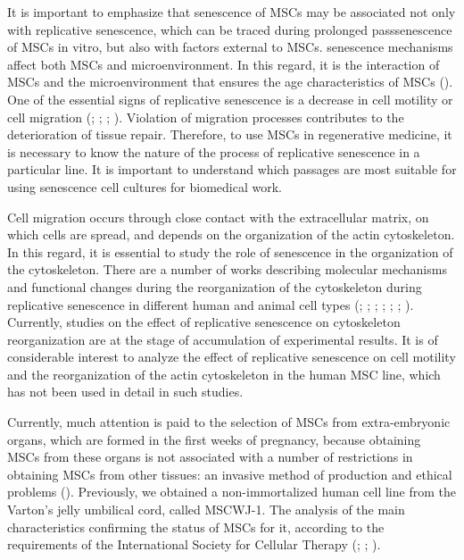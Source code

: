 \documentclass[english,authoryear]{elsarticle}
\begin{document}
It is important to emphasize that senescence of MSCs may be associated not only with replicative senescence, which can be traced during prolonged passsenescence of MSCs in vitro, but also with factors external to MSCs.
senescence mechanisms affect both MSCs and microenvironment.
In this regard, it is the interaction of MSCs and the microenvironment that ensures the age characteristics of MSCs (\cite{sethe2006senescence}).
One of the essential signs of replicative senescence is a decrease in cell motility or cell migration (\cite{geissler2012functional}; \cite{bertolo2015vitro}; \cite{turinetto2016senescence}; \cite{zhang2018overexpression}).
Violation of migration processes contributes to the deterioration of tissue repair.
Therefore, to use MSCs in regenerative medicine, it is necessary to know the nature of the process of replicative senescence in a particular line.
It is important to understand which passages are most suitable for using senescence cell cultures for biomedical work.


Cell migration occurs through close contact with the extracellular matrix, on which cells are spread, and depends on the organization of the actin cytoskeleton.
In this regard, it is essential to study the role of senescence in the organization of the cytoskeleton.
There are a number of works describing molecular mechanisms and functional changes during the reorganization of the cytoskeleton during replicative senescence in different human and animal cell types (\cite{larsen2003phosphatases}; \cite{le2008regulation}; \cite{wang2009protein}; \cite{geissler2012functional}; \cite{ozcan2016unbiased}; \cite{turinetto2016senescence}; \cite{moujaber2019cellular}).
Currently, studies on the effect of replicative senescence on cytoskeleton reorganization are at the stage of accumulation of experimental results.
It is of considerable interest to analyze the effect of replicative senescence on cell motility and the reorganization of the actin cytoskeleton in the human MSC line, which has not been used in detail in such studies.


Currently, much attention is paid to the selection of MSCs from extra-embryonic organs, which are formed in the first weeks of pregnancy, because obtaining MSCs from these organs is not associated with a number of restrictions in obtaining MSCs from other tissues: an invasive method of production and ethical problems (\cite{bongso2013therapeutic}).
Previously, we obtained a non-immortalized human cell line from the Varton's jelly umbilical cord, called MSCWJ-1.
The analysis of the main characteristics confirming the status of MSCs for it, according to the requirements of the International Society for Cellular Therapy (\cite{dominici2006minimal}; \cite{sensebe2010mesenchymal}; \cite{krylova2017derivation}).
\end{document}
